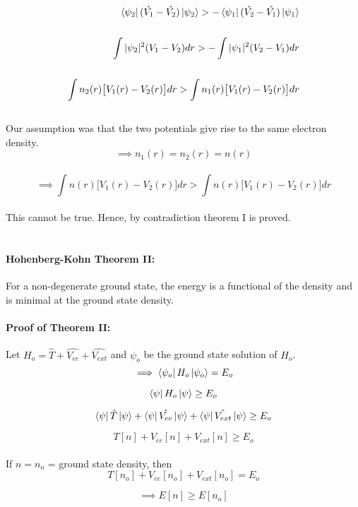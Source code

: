 \documentclass[12pt]{article}
\begin{document}
\begin{align*}
    \bra{\psi_2} (\hat{V_1} - \hat{V_2}) \ket{\psi_2} > -\bra{\psi_1} (\hat{V_2} - \hat{V_1}) \ket{\psi_1} \\
    \\
    \int |\psi_2|^2 (V_1 - V_2) dr > - \int |\psi_1|^2 (V_2 - V_1) dr\\
    \\
    \int n_2 (r) \big[V_1 (r) - V_2 (r) \big] dr > \int n_1 (r) \big[V_1 (r) - V_2 (r) \big] dr
\end{align*}
\\
Our assumption was that the two potentials give rise to the same electron density. 
\[ \implies n_1 (r) = n_2 (r) = n(r)\]
\\
\[ \implies \int n(r) \big[V_1 (r) - V_2 (r) \big] dr > \int n(r) \big[V_1 (r) - V_2 (r) \big] dr\]
\\
This cannot be true. Hence, by contradiction theorem I is proved. 
\\
\\
\paragraph{Hohenberg-Kohn Theorem II:}
For a non-degenerate ground state, the energy is a functional of the density and is minimal at the ground state density. 

\paragraph{Proof of Theorem II:} 

Let $H_o = \hat{T} + \hat{V_{ee}} + \hat{V_{ext}}$ and $\psi_o$ be the ground state solution of $H_o$.
\\
\[ \implies \bra{\psi_o} H_o \ket{\psi_o} = E_o \]

\[\bra{\psi} H_o \ket{\psi} \geq E_o \]

\[ \bra{\psi} \hat{T} \ket{\psi} + \bra{\psi} \hat{V_{ee}} \ket{\psi} + \bra{\psi} \hat{V_{ext}} \ket{\psi} \geq E_o \]

\[ T[n] + V_{ee} [n] + V_{ext} [n] \geq E_o \]
\\
If $n = n_o$ = ground state density, then
\\
\[ T[n_o] + V_{ee} [n_o] + V_{ext} [n_o] = E_o \]

\[ \implies E[n] \geq E[n_o] \]
\end{document}
